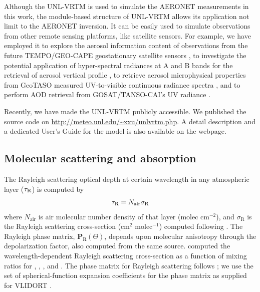 Although the UNL-VRTM is used to simulate the AERONET measurements in
this work, the module-based structure of UNL-VRTM allows its application 
not limit to the AERONET inversion. 
It can be easily used to simulate observations
from other remote sensing platforms, like satellite sensors. For
example, we have employed it to explore the aerosol information content
of observations from the future TEMPO/GEO-CAPE geostationary satellite
sensors \citep{Wang14}, to investigate the potential application of
hyper-spectral radiances at A and B bands for the retrieval of
aerosol vertical profile \citep{Wang14, Ding14}, to retrieve aerosol 
microphysical properties from GeoTASO measured UV-to-visible continuous 
radiance spectra \citep{Hou14}, and to perform AOD retrieval from 
GOSAT/TANSO-CAI's UV radiance \citep{Han14}. 

Recently, we have made the UNL-VRTM publicly accessible. We published
the source code on \url{http://meteo.unl.edu/~xxu/unlvrtm.php}. A
detail description and a dedicated User's Guide for the model is also 
available on the webpage.  

\subsection{Molecular scattering and absorption} \label{subsec:rayleigh}

The Rayleigh scattering optical depth at certain wavelength in any 
atmospheric layer ($\tau_\text{R}$) is computed by
\begin{equation}
\tau_\text{R} = N_\text{air}\sigma_\text{R} 
\end{equation}
where $N_\text{air}$ is air molecular number density of that layer
(molec cm$^{-2}$), and $\sigma_\text{R}$ is the Rayleigh scattering 
cross-section (cm$^2$ molec$^{-1}$) computed following
\citet{Bodhaine99}. The Rayleigh phase matrix,
$\mathbf{P}_\text{R}(\Theta)$, depends upon molecular 
anisotropy through the depolarization factor, also computed from the same 
source. \citet{Bodhaine99} computed the wavelength-dependent Rayleigh
scattering cross-section as a function of mixing ratios for ,
, , and . The phase matrix for Rayleigh scattering
follows \citet{Hansen74}; we use the set of spherical-function expansion
 coefficients for the phase matrix as supplied for VLIDORT
\citep{Spurr06}.

